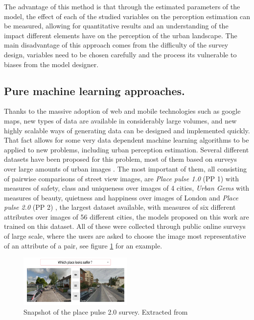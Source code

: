 The advantage of this method is that through the estimated parameters of the model, the effect
of each of the studied variables on the perception estimation can be measured, allowing for
quantitative results and an understanding of the impact different elements have on the
perception of the urban landscape. The main disadvantage of this approach comes from the
difficulty of the  survey design, variables need to be chosen carefully and the process its
vulnerable to biases from the model designer.

\subsection{Pure machine learning approaches.}

Thanks to the massive adoption of web and mobile technologies such as google maps, new types of
data are available in considerably large volumes, and new highly scalable ways of  generating data can be
designed and implemented quickly. That fact allows for some very data dependent machine learning
algorithms to be applied to new  problems, including urban perception estimation. Several different
datasets have been proposed for this problem, most of them based on surveys over large amounts of urban images
\cite{hidalgo_inequality, hidalgo_placepulse, quercia_aesthetic, liu_machine, santani}. The most important
of them, all consisting of pairwise comparisons of street view images, are \textit{Place pulse 1.0} (PP 1) \cite{hidalgo_inequality}
with measures of safety, class and uniqueness over images of 4 cities, \textit{Urban Gems} with measures of
beauty, quietness and happiness over images of London and \textit{Place pulse 2.0} (PP 2) \cite{hidalgo_placepulse}, the largest dataset
available, with measures of six different attributes over images of 56 different cities, the models proposed on this work are
trained on this dataset. All of these were collected through public online surveys of large scale, where the users
are asked to choose the image most representative of an attribute of a pair, see figure \ref{fig:survey} for an example.

\begin{figure}[ht]
	\begin{center}
	\includegraphics[width=0.5\textwidth]{./figures/placepulse.png}
	\caption[Place pulse 2.0 survey]{Snapshot of the place pulse 2.0 survey. Extracted from  }
	\label{fig:survey}
	\end{center}
\end{figure}

